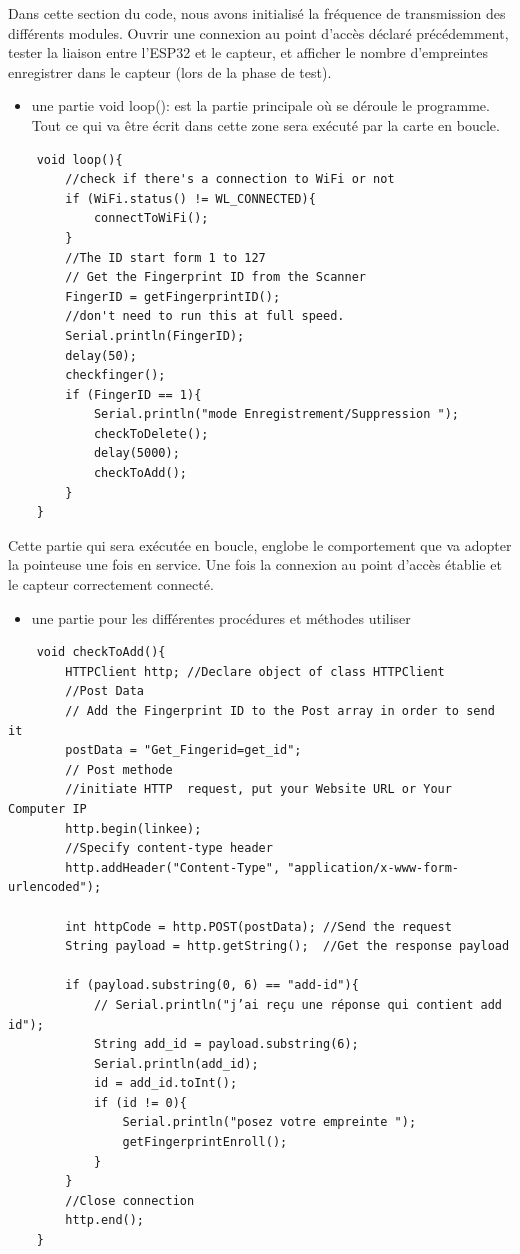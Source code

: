 Dans cette section du code, nous avons initialisé la fréquence de transmission
des différents modules. Ouvrir une connexion au point d’accès déclaré
précédemment, tester la liaison entre l’ESP32 et le capteur, et afficher le
nombre d’empreintes enregistrer dans le capteur (lors de la phase de test).      

\begin{itemize}
    \item [\textbullet] une partie void loop(): est la partie principale où se
        déroule le programme. Tout ce qui va être écrit dans cette zone sera
        exécuté par la carte en boucle. 
\end{itemize}

\begin{verbatim}
    void loop(){
        //check if there's a connection to WiFi or not
        if (WiFi.status() != WL_CONNECTED){
            connectToWiFi();
        }
        //The ID start form 1 to 127
        // Get the Fingerprint ID from the Scanner
        FingerID = getFingerprintID(); 
        //don't need to run this at full speed.
        Serial.println(FingerID);
        delay(50);
        checkfinger();
        if (FingerID == 1){
            Serial.println("mode Enregistrement/Suppression ");
            checkToDelete();
            delay(5000);
            checkToAdd();
        }
    }
\end{verbatim}

Cette partie qui sera exécutée en boucle, englobe le comportement que va adopter
la pointeuse une fois en service. Une fois la connexion au point d’accès établie
et le capteur correctement connecté.

\begin{itemize}
    \item[\textbullet] une partie pour les différentes procédures et méthodes
        utiliser 
\end{itemize}

\begin{verbatim}
    void checkToAdd(){
        HTTPClient http; //Declare object of class HTTPClient
        //Post Data
        // Add the Fingerprint ID to the Post array in order to send it 
        postData = "Get_Fingerid=get_id"; 
        // Post methode
        //initiate HTTP  request, put your Website URL or Your Computer IP
        http.begin(linkee);                                              
        //Specify content-type header
        http.addHeader("Content-Type", "application/x-www-form-urlencoded"); 

        int httpCode = http.POST(postData); //Send the request
        String payload = http.getString();  //Get the response payload

        if (payload.substring(0, 6) == "add-id"){
            // Serial.println("j’ai reçu une réponse qui contient add id");
            String add_id = payload.substring(6);
            Serial.println(add_id);
            id = add_id.toInt();
            if (id != 0){
                Serial.println("posez votre empreinte ");
                getFingerprintEnroll();
            }
        }
        //Close connection
        http.end(); 
    }
\end{verbatim}

